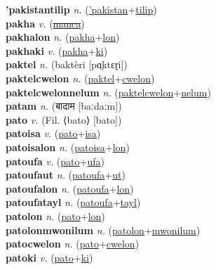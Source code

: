\textbf{'pakistantilip} \textit{n.} (\hyperref['pakistan]{'pakistan}+\hyperref[tilip]{tilip})
 \label{'pakistantilip} \\
\textbf{pakha} \textit{v.} (\hyperref[manca]{\sout{manca}})
 \label{pakha} \\
\textbf{pakhalon} \textit{n.} (\hyperref[pakha]{pakha}+\hyperref[lon]{lon})
 \label{pakhalon} \\
\textbf{pakhaki} \textit{v.} (\hyperref[pakha]{pakha}+\hyperref[ki]{ki})
 \label{pakhaki} \\
\textbf{paktel} \textit{n.} ({\javanese{}baktèri} [pɑ̤ktɛɽi])
 \label{paktel} \\
\textbf{paktelcwelon} \textit{n.} (\hyperref[paktel]{paktel}+\hyperref[cwelon]{cwelon})
 \label{paktelcwelon} \\
\textbf{paktelcwelonnelum} \textit{n.} (\hyperref[paktelcwelon]{paktelcwelon}+\hyperref[nelum]{nelum})
 \label{paktelcwelonnelum} \\
\textbf{patam} \textit{n.} ({\devanagari{}बादाम} [baːdaːm])
 \label{patam} \\
\textbf{pato} \textit{v.} (Fil. ⟨bato⟩ [bato])
 \label{pato} \\
\textbf{patoisa} \textit{v.} (\hyperref[pato]{pato}+\hyperref[isa]{isa})
 \label{patoisa} \\
\textbf{patoisalon} \textit{n.} (\hyperref[patoisa]{patoisa}+\hyperref[lon]{lon})
 \label{patoisalon} \\
\textbf{patoufa} \textit{v.} (\hyperref[pato]{pato}+\hyperref[ufa]{ufa})
 \label{patoufa} \\
\textbf{patoufaut} \textit{n.} (\hyperref[patoufa]{patoufa}+\hyperref[ut]{ut})
 \label{patoufaut} \\
\textbf{patoufalon} \textit{n.} (\hyperref[patoufa]{patoufa}+\hyperref[lon]{lon})
 \label{patoufalon} \\
\textbf{patoufatayl} \textit{n.} (\hyperref[patoufa]{patoufa}+\hyperref[tayl]{tayl})
 \label{patoufatayl} \\
\textbf{patolon} \textit{n.} (\hyperref[pato]{pato}+\hyperref[lon]{lon})
 \label{patolon} \\
\textbf{patolonmwonilum} \textit{n.} (\hyperref[patolon]{patolon}+\hyperref[mwonilum]{mwonilum})
 \label{patolonmwonilum} \\
\textbf{patocwelon} \textit{n.} (\hyperref[pato]{pato}+\hyperref[cwelon]{cwelon})
 \label{patocwelon} \\
\textbf{patoki} \textit{v.} (\hyperref[pato]{pato}+\hyperref[ki]{ki})
 \label{patoki} \\
